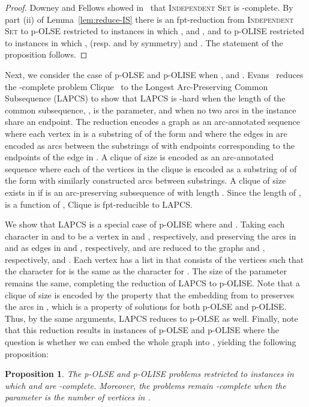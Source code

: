 \documentclass[11pt]{article}
\newtheorem{proposition}[theorem]{Proposition}
\begin{document}
\begin{proof}
Downey and Fellows showed in~\cite{df2} that \textsc{Independent Set} is -complete.  By part (ii) of Lemma~\ref{lem:reduce-IS} there is an fpt-reduction from \textsc{Independent Set} to p-OLSE restricted to instances in which ,  and , and to p-OLISE restricted to instances in which ,  (resp.  and  by symmetry) and . The statement of the proposition follows.
\end{proof}

Next, we consider the case of p-OLSE and p-OLISE when ,  and . Evans~\cite{evans} reduces the -complete problem {\sc Clique}~\cite{fptbook} to the {\sc Longest Arc-Preserving Common Subsequence} (LAPCS) to show that LAPCS is -hard when the length of the common subsequence, , is the parameter, and when no two arcs in the instance share an endpoint. The reduction encodes a graph  as an arc-annotated sequence  where each vertex in  is a substring of  of the form  and where the edges in  are encoded as arcs between the substrings of  with endpoints corresponding to the endpoints of the edge in .  A clique of size  is encoded as an arc-annotated sequence  where each of the  vertices in the clique is encoded as a substring of  of the form  with similarly constructed arcs between substrings.  A clique of size  exists in  if  is an arc-preserving subsequence of  with length .  Since the length of , is a function of , {\sc Clique} is fpt-reducible to LAPCS.

We show that LAPCS is a special case of p-OLISE where  and .  Taking each character in  and  to be a vertex in  and , respectively, and preserving the arcs in  and  as edges in  and , respectively,  and  are reduced to the graphs  and , respectively, and . Each vertex  has a list in  that consists of the vertices  such that the character for  is the same as the character for .  The size of the parameter  remains the same, completing the reduction of LAPCS to p-OLISE.  Note that a clique of size  is encoded by the property that the embedding from  to  preserves the arcs in , which is a property of solutions for both p-OLSE and p-OLISE.  Thus, by the same arguments, LAPCS reduces to p-OLSE as well.  Finally, note that this reduction results in instances of p-OLSE and p-OLISE where the question is whether we can embed the whole graph  into , yielding the following proposition:

\begin{proposition}\label{prop:whardness}
The p-OLSE and p-OLISE problems restricted to instances in which  and  are -complete.  Moreover, the problems remain -complete when the parameter  is the number of vertices in .
\end{proposition}
\end{document}
